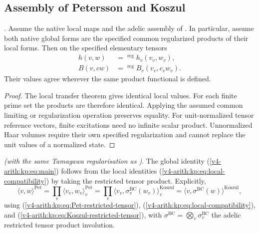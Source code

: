 \subsection{Assembly of Petersson and Koszul}
\label{v4-arith:kp:adelic:assembly}

\begin{theorem}
\label{v4-arith:kp:thm:tate-assembly}
\ClaimStatusProvedHereConditional.
Assume the native local maps and the adelic assembly of
. In particular, assume both
native global forms are the specified common regularized products of
their local forms. Then on the specified elementary tensors
\begin{align}
 h(v,w)&=\mathop{\prod_v}^{\mathrm{reg}}h_v(v_v,w_v),
 \label{v4-arith:kp:eq:Pet-restricted-tensor}\\
 B(v,cw)&=\mathop{\prod_v}^{\mathrm{reg}}B_v(v_v,c_vw_v).
 \label{v4-arith:kp:eq:Koszul-restricted-tensor}
\end{align}
Their values agree wherever the same product functional is defined.
\end{theorem}
\begin{proof}
The local transfer theorem gives identical local values. For each
finite prime set the products are therefore identical. Applying the
assumed common limiting or regularization operation preserves equality.
For unit-normalized tensor reference vectors, finite excitations need
no infinite scalar product. Unnormalized Haar volumes require their
own specified regularization and cannot replace the unit values of a
normalized state.
\end{proof}

\begin{corollary}
\label{v4-arith:kp:cor:global-from-local}
\ClaimStatusProvedHereConditional \emph{(with the same Tamagawa
regularisation as )}. The global identity
(\ref{v4-arith:kp:eq:main}) follows from the local identities
(\ref{v4-arith:kp:eq:local-compatibility}) by taking the
restricted tensor product. Explicitly,
\begin{equation*}
\langle v,w\rangle^{\mathrm{Pet}}
=\prod_{v}\langle v_{v},w_{v}\rangle^{\mathrm{Pet}}_{v}
=\prod_{v}\langle v_{v},\sigma^{\mathrm{BC}}_{v}(w_{v})\rangle^{\mathrm{Koszul}}_{v}
=\langle v,\sigma^{\mathrm{BC}}(w)\rangle^{\mathrm{Koszul}},
\end{equation*}
using (\ref{v4-arith:kp:eq:Pet-restricted-tensor}),
(\ref{v4-arith:kp:eq:local-compatibility}), and
(\ref{v4-arith:kp:eq:Koszul-restricted-tensor}), with
\(\sigma^{\mathrm{BC}}=\bigotimes_{v}\sigma^{\mathrm{BC}}_{v}\)
the adelic restricted tensor product involution.
\end{corollary}

